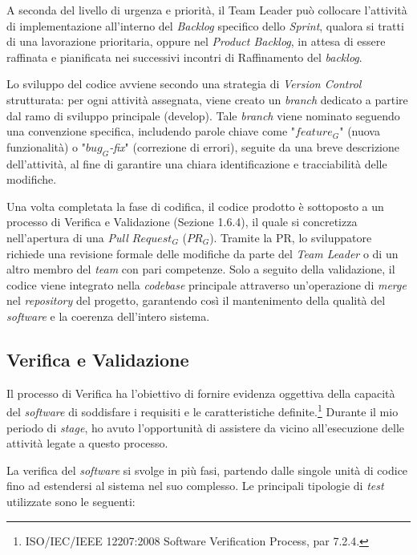         \noindent A seconda del livello di urgenza e priorità, il Team Leader può collocare l’attività di implementazione all’interno del \textit{Backlog} specifico dello \textit{Sprint}, qualora si tratti di una lavorazione prioritaria, oppure nel \textit{Product Backlog}, in attesa di essere raffinata e pianificata nei successivi incontri di Raffinamento del \textit{backlog}.

        \noindent Lo sviluppo del codice avviene secondo una strategia di \textit{Version Control} strutturata: per ogni attività assegnata, viene creato un \textit{branch} dedicato a partire dal ramo di sviluppo principale (develop). Tale \textit{branch} viene nominato seguendo una convenzione specifica, includendo parole chiave come "\textit{$feature_G$}" (nuova funzionalità) o "\textit{$bug_G$-fix}" (correzione di errori), seguite da una breve descrizione dell’attività, al fine di garantire una chiara identificazione e tracciabilità delle modifiche.


        \noindent Una volta completata la fase di codifica, il codice prodotto è sottoposto a un processo di Verifica e Validazione (Sezione 1.6.4), il quale si concretizza nell'apertura di una \textit{Pull $Request_G$} ($PR_G$). Tramite la PR, lo sviluppatore richiede una revisione formale delle modifiche da parte del \textit{Team Leader} o di un altro membro del \textit{team} con pari competenze. Solo a seguito della validazione, il codice viene integrato nella \textit{codebase} principale attraverso un'operazione di \textit{merge} nel \textit{repository} del progetto, garantendo così il mantenimento della qualità del \textit{software} e la coerenza dell’intero sistema.

        
        \subsection{Verifica e Validazione}
        Il processo di Verifica ha l’obiettivo di fornire evidenza oggettiva della capacità del \textit{software} di soddisfare i requisiti e le caratteristiche definite.\footnote{ISO/IEC/IEEE 12207:2008 Software Verification Process, par 7.2.4.} Durante il mio periodo di \textit{stage}, ho avuto l'opportunità di assistere da vicino all'esecuzione delle attività legate a questo processo.

        \noindent La verifica del \textit{software} si svolge in più fasi, partendo dalle singole unità di codice fino ad estendersi al sistema nel suo complesso. Le principali tipologie di \textit{test} utilizzate sono le seguenti:

